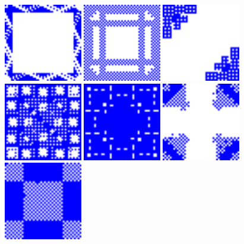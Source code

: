 \begin{frame}
  \frametitle{\problemtitle}
  \includegraphics[width=3.4cm]{60-pretty}
  \includegraphics[width=3.4cm]{61-pretty}
  \includegraphics[width=3.4cm]{62-pretty}
  \includegraphics[width=3.4cm]{63-pretty}
  \includegraphics[width=3.4cm]{64-pretty}
  \includegraphics[width=3.4cm]{65-pretty}
  \includegraphics[width=3.4cm]{67-pretty}

\end{frame}
